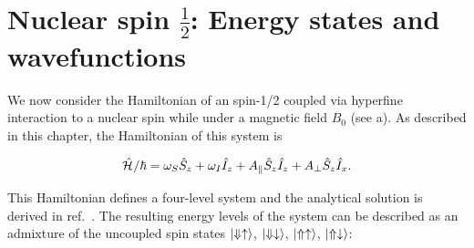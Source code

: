 



\section[Nuclear spin $\tfrac{1}{2}$]{Nuclear spin $\tfrac{1}{2}$: Energy states and wavefunctions}

We now consider the Hamiltonian of an \Er spin-1/2 coupled via hyperfine interaction to a \W nuclear spin while under a magnetic field $B_0$ (see a). As described in this chapter, the Hamiltonian of this system is

\begin{equation}
    \hat{\mathcal{H}}_{\text{}}/\hbar = \omega_S \hat{S}_z + \omega_I \hat{I}_z + A_\parallel \hat{S}_z \hat{I}_z + A_\perp \hat{S}_z \hat{I}_x.
\end{equation}


This Hamiltonian defines a four-level system and the analytical solution is derived in ref.~. The resulting energy levels of the system can be described as an admixture of the uncoupled spin states $\ket{\Downarrow \uparrow}$, $\ket{\Downarrow \downarrow}$, $\ket{\Uparrow \uparrow}$, $\ket{\Uparrow \downarrow}$: 


